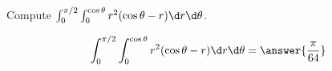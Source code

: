 \documentclass{ximera}
\author{David Guichard \and Neal Koblitz \and H. Jerome Keisler \and Albert Scheller \and Barry Balof \and Mike Wills \and Matthew Carr}
\begin{document}
\begin{exercise}




Compute $\int_{0}^{\pi/2}\int_{0}^{\cos\theta}r^2 (\cos\theta-r)\d r\d\theta$.
\begin{prompt}
\[
\int_{0}^{\pi/2}\int_{0}^{\cos\theta}r^2 (\cos\theta-r)\d r\d\theta=\answer{\frac{\pi}{64}}
\]
\end{prompt}



\end{exercise}
\end{document}
